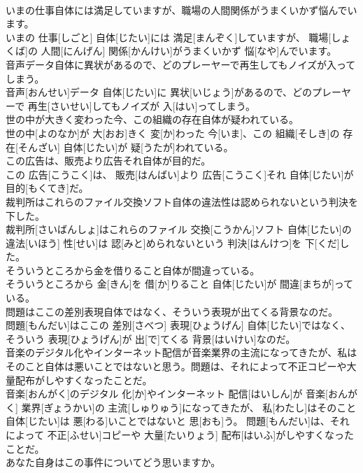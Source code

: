 \documentclass[8pt]{extreport}
\begin{document}
\begin{CJK}{UTF8}{min}
\\	いまの仕事自体には満足していますが、職場の人間関係がうまくいかず悩んでいます。	
\\	いまの 仕事[しごと] 自体[じたい]には 満足[まんぞく]していますが、 職場[しょくば]の 人間[にんげん] 関係[かんけい]がうまくいかず 悩[なや]んでいます。
\\	音声データ自体に異状があるので、どのプレーヤーで再生してもノイズが入ってしまう。	
\\	音声[おんせい]データ 自体[じたい]に 異状[いじょう]があるので、どのプレーヤーで 再生[さいせい]してもノイズが 入[はい]ってしまう。
\\	世の中が大きく変わった今、この組織の存在自体が疑われている。	
\\	世の中[よのなか]が 大[おお]きく 変[か]わった 今[いま]、この 組織[そしき]の 存在[そんざい] 自体[じたい]が 疑[うたが]われている。
\\	この広告は、販売より広告それ自体が目的だ。	
\\	この 広告[こうこく]は、 販売[はんばい]より 広告[こうこく]それ 自体[じたい]が 目的[もくてき]だ。
\\	裁判所はこれらのファイル交換ソフト自体の違法性は認められないという判決を下した。	
\\	裁判所[さいばんしょ]はこれらのファイル 交換[こうかん]ソフト 自体[じたい]の 違法[いほう] 性[せい]は 認[みと]められないという 判決[はんけつ]を 下[くだ]した。
\\	そういうところから金を借りること自体が間違っている。	
\\	そういうところから 金[きん]を 借[か]りること 自体[じたい]が 間違[まちが]っている。
\\	問題はここの差別表現自体ではなく、そういう表現が出てくる背景なのだ。	
\\	問題[もんだい]はここの 差別[さべつ] 表現[ひょうげん] 自体[じたい]ではなく、そういう 表現[ひょうげん]が 出[で]てくる 背景[はいけい]なのだ。
\\	音楽のデジタル化やインターネット配信が音楽業界の主流になってきたが、私はそのこと自体は悪いことではないと思う。問題は、それによって不正コピーや大量配布がしやすくなったことだ。	
\\	音楽[おんがく]のデジタル 化[か]やインターネット 配信[はいしん]が 音楽[おんがく] 業界[ぎょうかい]の 主流[しゅりゅう]になってきたが、 私[わたし]はそのこと 自体[じたい]は 悪[わる]いことではないと 思[おも]う。 問題[もんだい]は、それによって 不正[ふせい]コピーや 大量[たいりょう] 配布[はいふ]がしやすくなったことだ。
\\	あなた自身はこの事件についてどう思いますか。	

\end{CJK}
\end{document}
